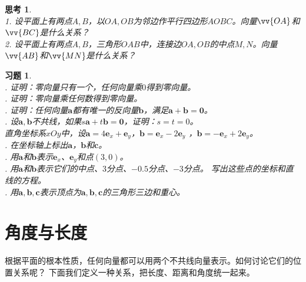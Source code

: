 \documentclass[12pt,UTF8]{ctexbook}
\newtheorem{sk}{思考}[section]
\newtheorem{xt}{习题}[section]
\begin{document}
\begin{sk}\label{sk:0-0-10}
    \mbox{}\\
    1. 设平面上有两点$A,B$，以$OA, OB$为邻边作平行四边形$AOBC$。向量$\vv{OA}$和$\vv{BC}$是什么关系？\\
    2. 设平面上有两点$A,B$，三角形$OAB$中，连接边$OA, OB$的中点$M,N$。向量$\vv{AB}$和$\vv{MN}$是什么关系？
\end{sk}
\begin{xt}\label{xt:0-0-10}
    \mbox{} \\
    . 证明：零向量只有一个，任何向量乘$0$得到零向量。\\
    . 证明：零向量乘任何数得到零向量。\\
    . 证明：任何向量$\mathbf{a}$都有唯一的反向量$\mathbf{b}$，满足$\mathbf{a} + \mathbf{b} = \mathbf{0}$。\\
    . 设$\mathbf{a}, \mathbf{b}$不共线，如果$s\mathbf{a} + t\mathbf{b} = \mathbf{0}$，证明：$s = t = 0$。\\
    直角坐标系$xOy$中，设$\mathbf{a} = 4\mathbf{e}_x + \mathbf{e}_y$，$\mathbf{b} = \mathbf{e}_x - 2\mathbf{e}_y$
    ，$\mathbf{b} = -\mathbf{e}_x + 2\mathbf{e}_y$。\\
    . 在坐标轴上标出$\mathbf{a}$，$\mathbf{b}$和$\mathbf{c}$。\\
    . 用$\mathbf{a}$和$\mathbf{b}$表示$\mathbf{e}_x$、$\mathbf{e}_y$和点$(3,0)$。\\
    . 用$\mathbf{a}$和$\mathbf{b}$表示它们的中点、$3$分点、$-0.5$分点、$-3$分点。
    写出这些点的坐标和直线的方程。\\
    . 用$\mathbf{a}, \mathbf{b}, \mathbf{c}$表示顶点为$\mathbf{a}, \mathbf{b}, \mathbf{c}$的三角形三边和重心。
\end{xt}

\section{角度与长度}
根据平面的根本性质，任何向量都可以用两个不共线向量表示。如何讨论它们的位置关系呢？
下面我们定义一种关系，把长度、距离和角度统一起来。
\end{document}
